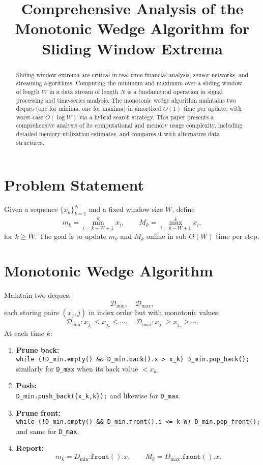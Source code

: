 \documentclass[11pt,letterpaper]{article}
\title{Comprehensive Analysis of the Monotonic Wedge Algorithm for Sliding Window Extrema}
\date{}
\begin{document}
\maketitle

\begin{abstract}
Sliding‐window extrema are critical in real‐time financial analysis, sensor networks, and streaming algorithms.  Computing the minimum and maximum over a sliding window of length \(W\) in a data stream of length \(N\) is a fundamental operation in signal processing and time‐series analysis.  The monotonic wedge algorithm maintains two deques (one for minima, one for maxima) in amortized \(O(1)\) time per update, with worst‐case \(O(\log W)\) via a hybrid search strategy.  This paper presents a comprehensive analysis of its computational and memory usage complexity, including detailed memory‐utilization estimates, and compares it with alternative data structures.
\end{abstract}

\section{Problem Statement}
Given a sequence \(\{x_k\}_{k=1}^N\) and a fixed window size \(W\), define
\[
  m_k = \min_{i=k-W+1}^k x_i,\qquad
  M_k = \max_{i=k-W+1}^k x_i,
\]
for \(k \ge W\).  The goal is to update \(m_k\) and \(M_k\) online in sub-\(O(W)\) time per step.

\section{Monotonic Wedge Algorithm}
Maintain two deques:
\[
  \mathcal{D}_{\min},\quad \mathcal{D}_{\max},
\]
each storing pairs \((x_j,j)\) in index order but with monotonic values:
\[
  \mathcal{D}_{\min}\colon x_{j_1}\le x_{j_2}\le\cdots,\quad
  \mathcal{D}_{\max}\colon x_{j_1}\ge x_{j_2}\ge\cdots.
\]
At each time \(k\):
\begin{enumerate}
  \item \textbf{Prune back:}\\
    \texttt{while\,(!D\_min.empty() \&\& D\_min.back().x > x\_k) D\_min.pop\_back();}\\
    similarly for \texttt{D\_max} when its back value \(<x_k\).
  \item \textbf{Push:}\\
    \texttt{D\_min.push\_back(\{x\_k,k\});} and likewise for \texttt{D\_max}.
  \item \textbf{Prune front:}\\
    \texttt{while\,(!D\_min.empty() \&\& D\_min.front().i <= k-W) D\_min.pop\_front();}\\
    and same for \texttt{D\_max}.
  \item \textbf{Report:}\\
    \[
      m_k = D_{\min}.\texttt{front}().x,\qquad
      M_k = D_{\max}.\texttt{front}().x.
    \]
\end{enumerate}
\end{document}
